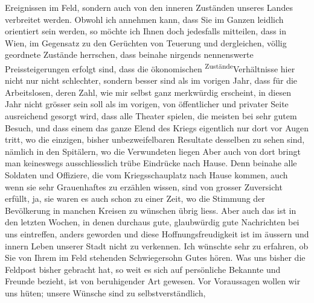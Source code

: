 {\begin{ledgroupsized}[t]{13cm}
                    Ereignissen im Feld, sondern auch von den inneren Zuständen unseres Landes
                    verbreitet werden. Obwohl ich annehmen kann, dass Sie im Ganzen \label{LL710-1v}\label{LL710-1h}leidlich orientiert sein werden, so möchte
                    ich Ihnen doch jedesfalls mitteilen, dass in Wien, im Gegensatz zu den Gerüchten von Teuerung und dergleichen,
                    völlig geordnete Zustände herrschen, dass beinahe nirgends nennenswerte
                    Preissteigerungen erfolgt sind, dass die ökonomischen \substVorne{}\textsuperscript{Zustände}{\allowbreak}\substDazwischen{}Verhältnisse\substHinten{} hier nicht nur nicht schlechter, sondern besser sind als im vorigen
                    Jahr, dass für die Arbeitslosen, deren Zahl, wie mir selbst ganz merkwürdig
                    erscheint, in diesen Jahr nicht grösser sein soll als im vorigen, von
                    öffentlicher und privater Seite ausreichend {\pb}gesorgt wird, dass alle Theater spielen, die meisten bei sehr gutem Besuch,
                    und dass einem das ganze Elend des Kriegs eigentlich nur dort vor Augen tritt,
                    wo die einzigen, bisher unbezweifelbaren Resultate desselben zu sehen sind,
                    nämlich in den Spitälern, wo die Verwundeten liegen{\dotstwo}
                    Aber auch von dort bringt man keineswegs ausschliesslich trübe Eindrücke nach
                    Hause. Denn beinahe alle Soldaten und Offiziere, die vom Kriegsschauplatz nach
                    Hause kommen, auch wenn sie sehr Grauenhaftes zu erzählen wissen, sind von
                    grosser Zuversicht erfüllt, ja, sie waren es auch schon zu einer Zeit, wo die
                    Stimmung der Bevölkerung in manchen Kreisen zu wünschen übrig liess. Aber auch
                    das ist in den letzten Wochen, in denen durchaus gute, glaubwürdig gute
                    Nachrichten bei uns eintreffen, anders geworden und diese Hoffnungsfreudigkeit
                    ist im äussern und innern Leben unserer Stadt nicht zu verkennen.\pend
           \pstart
           Ich wünschte sehr zu erfahren, ob {\pb}Sie von
                    Ihrem im Feld stehenden Schwiegersohn Gutes hören. Was uns bisher die Feldpost
                    bisher gebracht hat, so weit es sich auf persönliche Bekannte und
                    Freunde bezieht, ist von beruhigender Art gewesen.\pend
           \pstart
           Vor Voraussagen wollen wir uns hüten; unsere Wünsche sind zu selbstverständlich,

\end{ledgroupsized}}
